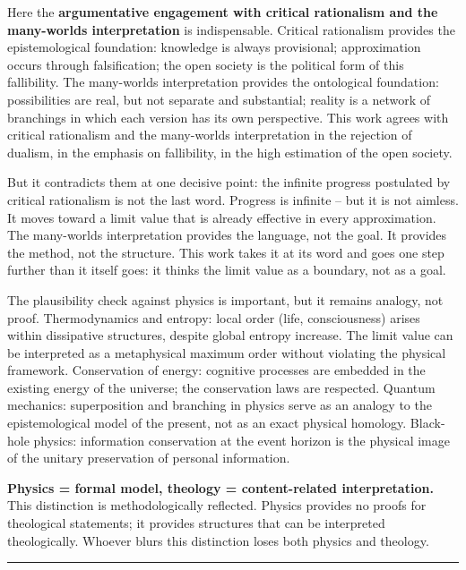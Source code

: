 \documentclass[
  english,
]{article}
\begin{document}
Here the \textbf{argumentative engagement with critical rationalism and
the many-worlds interpretation} is indispensable. Critical rationalism
provides the epistemological foundation: knowledge is always
provisional; approximation occurs through falsification; the open
society is the political form of this fallibility. The many-worlds
interpretation provides the ontological foundation: possibilities are
real, but not separate and substantial; reality is a network of
branchings in which each version has its own perspective. This work
agrees with critical rationalism and the many-worlds interpretation in
the rejection of dualism, in the emphasis on fallibility, in the high
estimation of the open society.

But it contradicts them at one decisive point: the infinite progress
postulated by critical rationalism is not the last word. Progress is
infinite -- but it is not aimless. It moves toward a limit value that is
already effective in every approximation. The many-worlds interpretation
provides the language, not the goal. It provides the method, not the
structure. This work takes it at its word and goes one step further than
it itself goes: it thinks the limit value as a boundary, not as a goal.

The plausibility check against physics is important, but it remains
analogy, not proof. Thermodynamics and entropy: local order (life,
consciousness) arises within dissipative structures, despite global
entropy increase. The limit value can be interpreted as a metaphysical
maximum order without violating the physical framework. Conservation of
energy: cognitive processes are embedded in the existing energy of the
universe; the conservation laws are respected. Quantum mechanics:
superposition and branching in physics serve as an analogy to the
epistemological model of the present, not as an exact physical homology.
Black-hole physics: information conservation at the event horizon is the
physical image of the unitary preservation of personal information.

\textbf{Physics = formal model, theology = content-related
interpretation.} This distinction is methodologically reflected. Physics
provides no proofs for theological statements; it provides structures
that can be interpreted theologically. Whoever blurs this distinction
loses both physics and theology.

\begin{center}\rule{0.5\linewidth}{0.5pt}\end{center}
\end{document}
